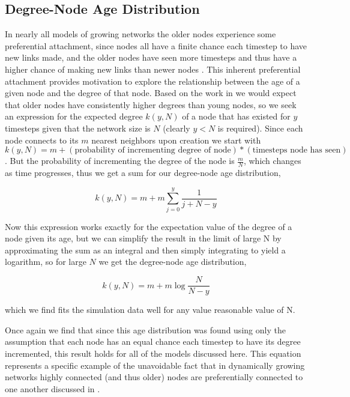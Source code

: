 \documentclass[aps,pre,reprint,superscriptaddress,amsmath,amssymb]{revtex4-1}
\begin{document}
\subsection{Degree-Node Age Distribution}
In nearly all models of growing networks the older nodes experience some preferential attachment, since nodes all have a finite chance each timestep to have new links made, and the older nodes have seen more timesteps and thus have a higher chance of making new links than newer nodes \cite{reallyrandom}.
This inherent preferential attachment provides motivation to explore the relationship between the age of a given node and the degree of that node. 
Based on the work in \cite{reallyrandom} we would expect that older nodes have consistently higher degrees than young nodes, so we seek an expression for the expected degree $k(y,N)$ of a node that has existed for $y$ timesteps given that the network size is $N$ (clearly $y < N$ is required).
Since each node connects to its $m$ nearest neighbors upon creation we start with $k(y,N) = m + (\text{probability of incrementing degree of node})*(\text{timesteps node has seen})$.
But the probability of incrementing the degree of the node is $\frac{m}{N}$, which changes as time progresses, thus we get a sum for our degree-node age distribution,

\[k(y,N) = m + m\sum_{j=0}^{y} \frac{1}{j+N-y}\]

Now this expression works exactly for the expectation value of the degree of a node given its age, but we can simplify the result in the limit of large N by approximating the sum as an integral and then simply integrating to yield a logarithm, so for large $N$ we get the degree-node age distribution,

\[k(y,N) = m + m\log{\frac{N}{N-y}}\]

which we find fits the simulation data well for any value reasonable value of N.
 
Once again we find that since this age distribution was found using only the assumption that each node has an equal chance each timestep to have its degree incremented, this result holds for all of the models discussed here.
This equation represents a specific example of the unavoidable fact that in dynamically growing networks highly connected (and thus older) nodes are preferentially connected to one another discussed in \cite{reallyrandom}.

\end{document}
